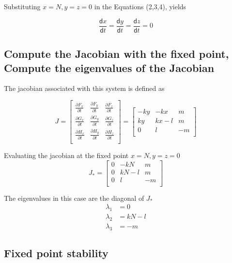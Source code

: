 \documentclass[a4paper]{article}
\begin{document}
Substituting $x = N, y = z = 0$ in the Equations (2,3,4), yields

\begin{equation}
\frac{\mathsf{d}x}{\mathsf{d}t} = \frac{\mathsf{d}y}{\mathsf{d}t} = \frac{\mathsf{d}z}{\mathsf{d}t} = 0
\end{equation}

\subsection{Compute the Jacobian with the fixed point, Compute the eigenvalues of the Jacobian}

The jacobian associated with this system is defined as 

\[
J
=
\begin{bmatrix}
    \frac{\partial F_{x}}{\partial t} & \frac{\partial F_{y}}{\partial t} & \frac{\partial F_{z}}{\partial t} \\
    \frac{\partial G_{x}}{\partial t} & \frac{\partial G_{y}}{\partial t} & \frac{\partial G_{z}}{\partial t} \\
    \frac{\partial H_{x}}{\partial t} & \frac{\partial H_{y}}{\partial t} & \frac{\partial H_{z}}{\partial t} \\
\end{bmatrix}
= 
\begin{bmatrix}
    -ky & -kx & m \\
    ky & kx-l & m \\
    0 & l & -m \\
\end{bmatrix}
\]

Evaluating the jacobian at the fixed point $x = N, y = z = 0$
\[
J_{*}
= 
\begin{bmatrix}
    0 & -kN & m \\
    0 & kN-l & m \\
    0 & l & -m \\
\end{bmatrix}
\]

The eigenvalues in this case are the diagonal of $J_{*}$
\begin{align*}
 \lambda_{1} &= 0 \\
 \lambda_{2} &= kN - l \\
 \lambda_{3} &= -m 
\end{align*}

\subsection{Fixed point stability}
\end{document}
